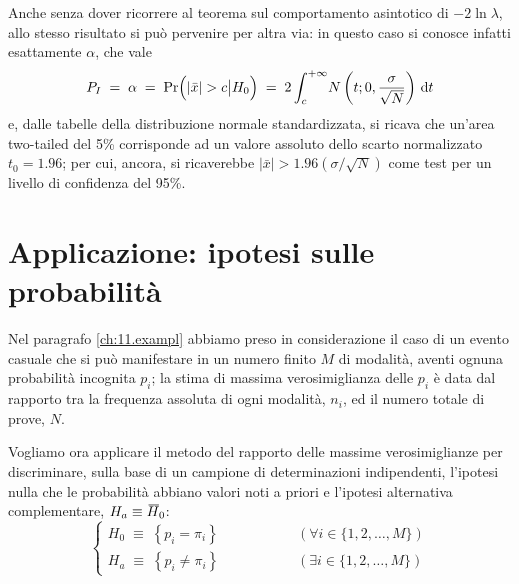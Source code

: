 Anche senza dover ricorrere al teorema sul comportamento
asintotico di $- 2 \ln \lambda$, allo stesso risultato si
pu\`o pervenire per altra via: in questo caso si conosce
infatti esattamente $\alpha$, che vale
\begin{equation*}
  P_I \; = \; \alpha \; = \; \Pr \Bigl( | \bar x | > c
    \bigl| H_0 \bigr. \Bigr) \; = \; 2 \int_c^{+\infty} \!
    N \left( t; 0, \frac{\sigma}{\sqrt{N}} \right) \, \mathrm{d} t
\end{equation*}
e, dalle tabelle della distribuzione normale standardizzata,
si ricava che un'area two-tailed del 5\% corrisponde ad un
valore assoluto dello scarto normalizzato $t_0 = 1.96$; per
cui, ancora, si ricaverebbe $| \bar x | > 1.96 ( \sigma /
\sqrt{N} )$ come test per un livello di confidenza del
95\%.

\section{Applicazione: ipotesi sulle probabilit\`a}
Nel paragrafo \ref{ch:11.exampl} abbiamo preso in
considerazione il caso di un evento casuale che si pu\`o
manifestare in un numero finito $M$ di modalit\`a, aventi
ognuna probabilit\`a incognita $p_i$; la stima di massima
verosimiglianza delle $p_i$ \`e data dal rapporto tra la
frequenza assoluta di ogni modalit\`a, $n_i$, ed il numero
totale di prove, $N$.

Vogliamo ora applicare il metodo del rapporto delle massime
verosimiglianze per discriminare, sulla base di un campione
di determinazioni indipendenti, l'ipotesi nulla che le
probabilit\`a abbiano valori noti a priori e l'ipotesi
alternativa complementare, $H_a \equiv \ob{H}_0$:
\begin{equation*}
  \begin{cases}
    H_0 \; \equiv \; \left\{ p_i = \pi_i \right\} &
    \hspace{2cm} (\forall  i \in \{ 1, 2,\ldots, M \})
    \\[1ex]
    H_a \; \equiv \; \left\{ p_i \ne \pi_i \right\} &
    \hspace{2cm} (\exists i \in \{ 1, 2,\ldots, M \})
  \end{cases}
\end{equation*}

